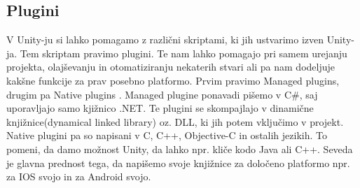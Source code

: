 {\color{indiagreen}\subsection{Plugini}}
V Unity-ju si lahko pomagamo z različni skriptami, ki jih ustvarimo izven Unity-ja. Tem skriptam pravimo plugini. Te nam lahko pomagajo pri samem urejanju projekta, olajševanju in otomatiziranju nekaterih stvari ali pa nam dodeljuje kakšne funkcije za prav posebno platformo. Prvim pravimo Managed plugins, drugim pa Native plugins \cite{manual}. Managed plugine ponavadi pišemo v C\#, saj uporavljajo samo kjižnico .NET. Te plugini se skompajlajo v dinamične knjižnice(dynamical linked library) oz. DLL, ki jih potem vključimo v projekt. Native plugini pa so napisani v C, C++, Objective-C in ostalih jezikih. To pomeni, da damo možnost Unity, da lahko npr. kliče kodo Java ali C++. Seveda je glavna prednost tega, da napišemo svoje knjižnice za določeno platformo npr. za IOS svojo in za Android svojo. 